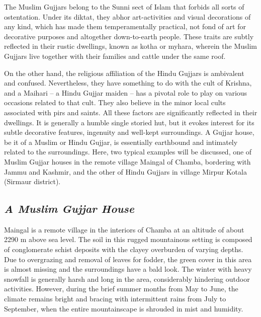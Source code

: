 The Muslim Gujjars belong to the Sunni sect of Islam that forbids all sorts of ostentation. Under its diktat, they abhor art-activities and visual decorations of any kind, which has made them temperamentally practical, not fond of art for decorative purposes and altogether down-to-earth people. These traits are subtly reflected in their rustic dwellings, known as kotha or myhara, wherein the Muslim Gujjars live together with their families and cattle under the same roof.

On the other hand, the religious affiliation of the Hindu Gujjars is ambivalent and confused. Nevertheless, they have something to do with the cult of Krishna, and a Maihari – a Hindu Gujjar maiden – has a pivotal role to play on various occasions related to that cult. They also believe in the minor local cults associated with pirs and saints. All these factors are significantly reflected in their dwellings. It is generally a humble single storied hut, but it evokes interest for its subtle decorative features, ingenuity and well-kept surroundings. A Gujjar house, be it of a Muslim or Hindu Gujjar, is essentially earthbound and intimately related to the surroundings. Here, two typical examples will be discussed, one of Muslim Gujjar houses in the remote village Maingal of Chamba, bordering with Jammu and Kashmir, and the other of Hindu Gujjars in village Mirpur Kotala (Sirmaur district).


\subsection*{\textit{A Muslim Gujjar House}}

Maingal is a remote village in the interiors of Chamba at an altitude of about 2290 m above sea level. The soil in this rugged mountainous setting is composed of conglomerate schist deposits with the clayey overburden of varying depths. Due to overgrazing and removal of leaves for fodder, the green cover in this area is almost missing and the surroundings have a bald look. The winter with heavy snowfall is generally harsh and long in the area, considerably hindering outdoor activities. However, during the brief summer months from May to June, the climate remains bright and bracing with intermittent rains from July to September, when the entire mountainscape is shrouded in mist and humidity.

